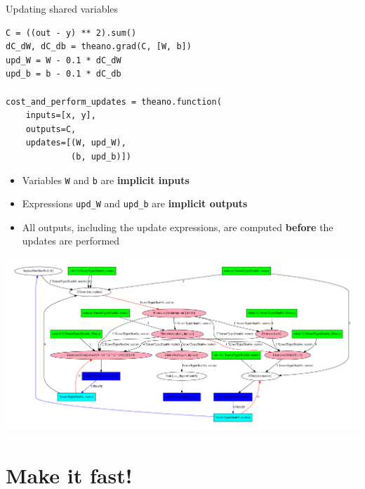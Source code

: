 \documentclass[a4paper,9pt]{beamer}
\begin{document}
\begin{frame}[fragile]{Updating shared variables}
  \begin{verbatim}
C = ((out - y) ** 2).sum()
dC_dW, dC_db = theano.grad(C, [W, b])
upd_W = W - 0.1 * dC_dW
upd_b = b - 0.1 * dC_db

cost_and_perform_updates = theano.function(
    inputs=[x, y],
    outputs=C,
    updates=[(W, upd_W),
             (b, upd_b)])
  \end{verbatim}
  \begin{itemize}
    \item Variables \verb|W| and \verb|b| are {\bf implicit inputs}
    \item Expressions \verb|upd_W| and \verb|upd_b| are {\bf implicit outputs}
    \item All outputs, including the update expressions, are computed {\bf before} the updates are performed
  \end{itemize}
\end{frame}

\begin{frame}
  \includegraphics[width=\textwidth]{pydotprint_cost_and_perform_updates.pdf}
\end{frame}


\section{Make it fast!}
\begin{frame}
  \tableofcontents[currentsection]
\end{frame}
\end{document}
